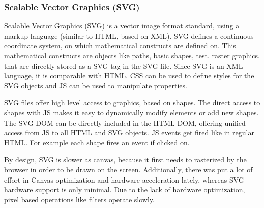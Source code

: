 \subsubsection{Scalable Vector Graphics (SVG)}
Scalable Vector Graphics (SVG) is a vector image format standard, using a markup language (similar to HTML, based on XML).
SVG defines a continuous coordinate system, on which mathematical constructs are defined on.
This mathematical constructs are objects like paths, basic shapes, test, raster graphics, that are directly stored as a SVG tag in the SVG file.
Since SVG is an XML language, it is comparable with HTML.
CSS can be used to define styles for the SVG objects and JS can be used to manipulate properties.

SVG files offer high level access to graphics, based on shapes.
The direct access to shapes with JS makes it easy to dynamically modify elements or add new shapes.
The SVG DOM can be directly included in the HTML DOM, offering unified access from JS to all HTML and SVG objects.
JS events get fired like in regular HTML.
For example each shape fires an  event if clicked on.


By design, SVG is slower as canvas, because it first needs to rasterized by the browser in order to be drawn on the screen.
Additionally, there was put a lot of effort in Canvas optimization and hardware acceleration lately, whereas SVG hardware support is only minimal.
Due to the lack of hardware optimization, pixel based operations like filters operate slowly.






